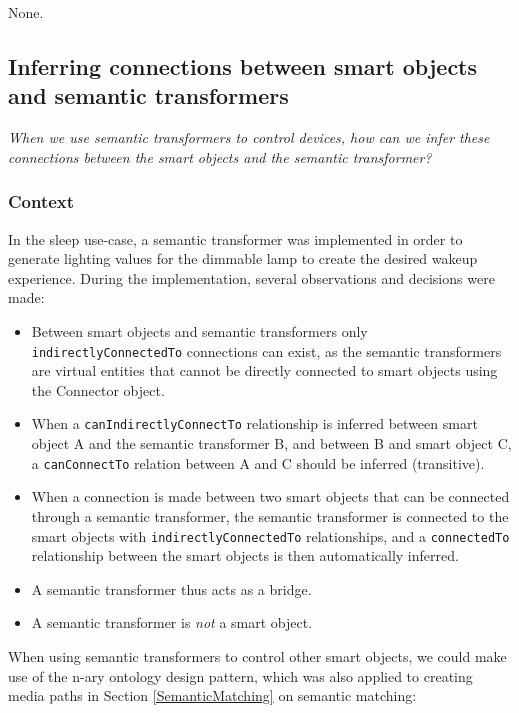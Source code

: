 None.



\subsection{Inferring connections between smart objects and semantic transformers }

\emph{When we use semantic transformers to control devices, how can we infer these connections between the smart objects and the semantic transformer?}
\subsubsection{Context}

In the sleep use-case, a semantic transformer was implemented in order to generate lighting values for the dimmable lamp to create the desired wakeup experience. During the implementation, several observations and decisions were made:

\begin{itemize}
\item 	Between smart objects and semantic transformers only \texttt{indirectly\-ConnectedTo} connections can exist, as the semantic transformers are virtual entities that cannot be directly connected to smart objects using the Connector object.
\item 	When a \texttt{canIndirectlyConnectTo} relationship is inferred between smart object A and the semantic transformer B, and between B and smart object C, a \texttt{canConnectTo} relation between A and C should be inferred (transitive).
\item 	When a connection is made between two smart objects that can be connected through a semantic transformer, the semantic transformer is connected to the smart objects with \texttt{indirectly\-ConnectedTo} relationships, and a \texttt{con\-nect\-ed\-To} relationship between the smart objects is then automatically inferred.
\item 	A semantic transformer thus acts as a bridge.
\item 	A semantic transformer is \emph{not} a smart object. 
\end{itemize}


When using semantic transformers to control other smart objects, we could make use of the n-ary ontology design pattern, which was also applied to creating media paths in Section \ref{SemanticMatching} on semantic matching: %

